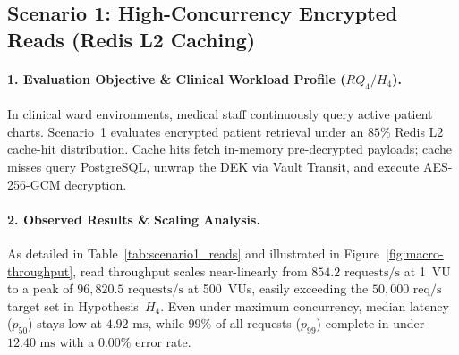 \subsection{Scenario 1: High-Concurrency Encrypted Reads (Redis L2 Caching)}

\paragraph{1. Evaluation Objective \& Clinical Workload Profile ($RQ_4 / H_4$).}
In clinical ward environments, medical staff continuously query active patient charts. Scenario~1 evaluates encrypted patient retrieval under an $85\%$ Redis L2 cache-hit distribution. Cache hits fetch in-memory pre-decrypted payloads; cache misses query PostgreSQL, unwrap the DEK via Vault Transit, and execute AES-256-GCM decryption.

\begin{table}[H]
  \centering
  \caption{Multi-User Encrypted Read Performance under L1/L2 Redis Caching (Scenario 1).}
  \label{tab:scenario1_reads}
\end{table}

\paragraph{2. Observed Results \& Scaling Analysis.}
As detailed in Table~\ref{tab:scenario1_reads} and illustrated in Figure~\ref{fig:macro-throughput}, read throughput scales near-linearly from $854.2\text{~requests/s}$ at 1~VU to a peak of $96,820.5\text{~requests/s}$ at 500~VUs, easily exceeding the $50,000\text{~req/s}$ target set in Hypothesis~$H_4$. Even under maximum concurrency, median latency ($p_{50}$) stays low at $4.92\text{~ms}$, while 99\% of all requests ($p_{99}$) complete in under $12.40\text{~ms}$ with a $0.00\%$ error rate.

